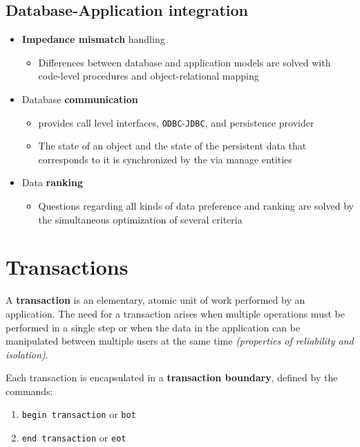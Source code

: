 \documentclass[english]{article}
\begin{document}
\subsection{Database-Application integration}

\begin{itemize}
  \item \textbf{Impedance mismatch} handling
        \begin{itemize}[label=\(\rightarrow\)]
          \item Differences between database and application models are solved with code-level procedures and object-relational mapping
        \end{itemize}
  \item Database \textbf{communication}
        \begin{itemize}[label=\(\rightarrow\)]
          \item \dbms provides call level interfaces, \texttt{ODBC}-\texttt{JDBC}, and \jpa persistence provider
          \item The state of an object and the state of the persistent data that corresponds to it is synchronized by the \dbms via \jpa manage entities
        \end{itemize}
  \item Data \textbf{ranking}
        \begin{itemize}[label=\(\rightarrow\)]
          \item Questions regarding all kinds of data preference and ranking are solved by the simultaneous optimization of several criteria
        \end{itemize}
\end{itemize}

\clearpage

\section{Transactions}

A \textbf{transaction} is an elementary, atomic unit of work performed by an application.
The need for a transaction arises when multiple operations must be performed in a single step or when the data in the application can be manipulated between multiple users at the same time \textit{(properties of reliability and isolation)}.

Each transaction is encapsulated in a \textbf{transaction boundary}, defined by the commands:

\begin{enumerate}
  \item \texttt{begin transaction} or \texttt{bot}
  \item \texttt{end transaction} or \texttt{eot}
\end{enumerate}
\end{document}
